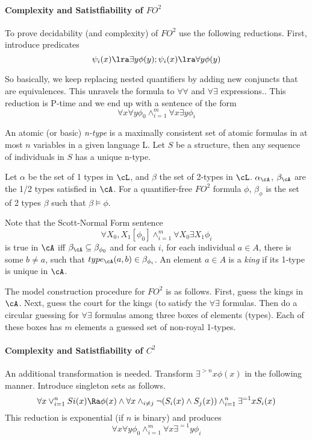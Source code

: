 \paragraph{Complexity and Satistfiability of $FO^2$}

To prove decidability (and complexity) of $FO^2$ use the following
reductions.  First, introduce predicates
\[ \psi_i(x) \lra \exists y \phi(y) ; \psi_i(x) \lra \forall y \phi(y) \]

So basically, we keep replacing nested quantifiers by adding new
conjuncts that are equivalences.  This unravels the formula to
$\forall \forall$ and $\forall \exists$ expressions..  This reduction
is P-time and we end up with a sentence of the form
\[
\forall x \forall y \phi_0 \wedge^{m}_{i = 1} \forall x \exists y \phi_i
\]

An atomic (or basic) {\em n-type} is a maximally consistent set of
atomic formulas in at most $n$ variables in a given language L.  Let
$S$ be a structure, then any sequence of individuals in $S$ has a
unique n-type.

Let $\alpha$ be the set of 1 types in $\cL$, and $\beta$ the set of
2-types in $\cL$.  $\alpha_{\cA}$, $\beta_{\cA}$ are the 1/2 types
satisfied in $\cA$.  For a quantifier-free $FO^2$ formula $\phi$,
$\beta_{\phi}$ is the set of 2 types $\beta$ such that $\beta \models
\phi$.

Note that the Scott-Normal Form sentence 
\[
 \forall X_0,X_1 [\phi_0] \wedge_{i = 1}^m \forall X_0 \exists X_1 \phi_i
\]
is true in $\cA$ iff $\beta_{\cA} \subseteq \beta_{\phi_0}$ and for
each $i$, for each individual $a \in A$, there is some $b \not = a$,
such that $type_{\cA}(a,b) \in \beta_{\phi_i}$.  An element $a \in A$
is a {\em king} if its 1-type is unique in $\cA$.

The model construction procedure for $FO^2$ is as follows.  First,
guess the kings in $\cA$.  Next, guess the court for the kings (to
satisfy the $\forall \exists$ formulas.  Then do a circular guessing
for $\forall \exists$ formulas among three boxes of elements
(types). Each of these boxes has $m$ elements a guessed set of
non-royal 1-types.


\paragraph{Complexity and Satistfiability of $C^2$}

An additional transformation is needed.  Transform
$\exists^{>n}x\phi(x)$ in the following manner.  Introduce singleton
sets as follows.
\[ \forall x \vee^n_{i=1} Si(x) \Ra \phi(x) \wedge 
\forall x \wedge_{i \not = j} \neg (S_i(x) \wedge S_j(x)) 
\wedge^n_{i = 1}\exists^{=1} x S_i(x)
\]
This reduction is exponential (if $n$ is binary) and produces
\[
\forall x \forall y \phi_0 \wedge^{m}_{i = 1} \forall x \exists^{=1} y \phi_i
\]

